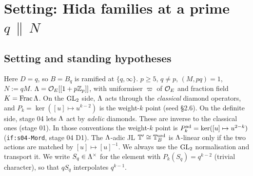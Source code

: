 \section{Setting: Hida families at a prime \texorpdfstring{$q\,\|\,N$}{q || N}}

\subsection{Setting and standing hypotheses}\label{ss:s06-setting}
Here $D=q$, so $B=B_q$ is ramified at $\{q,\infty\}$. $p\ge5$, $q\ne p$, $(M,pq)=1$, $N:=qM$. $\Lambda=\mathcal{O}_E[[1+p\mathbb{Z}_p]]$, with
uniformiser $\varpi$ of $\mathcal{O}_E$ and fraction field $K=\mathrm{Frac}\,\Lambda$. On the $\mathrm{GL}_2$ side, $\Lambda$ acts through the
\emph{classical} diamond operators, and $P_k=\ker([u]\mapsto u^{k-2})$ is the weight-$k$ point (seed \S2.6). On the definite side,
stage 04 lets $\Lambda$ act by \emph{adelic} diamonds. These are inverse to the classical ones (stage 01). In those conventions the
weight-$k$ point is $P^{\rm ad}_k=\ker([u]\mapsto u^{2-k})$ (\texttt{if:s04-Mord}, stage 04 D1). The $\Lambda$-adic JL
$\mathbb{T}'\cong\mathbb{T}^{\mathrm{ord}}_B$ is $\Lambda$-linear only if the two actions are matched by $[u]\mapsto[u]^{-1}$. We always use the $\mathrm{GL}_2$
normalisation and transport it. We write $S_q\in\Lambda^\times$ for the element with $P_k(S_q)=q^{k-2}$ (trivial character), so that
$qS_q$ interpolates $q^{k-1}$.

